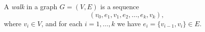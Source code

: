 \begin{dfn}
A \emph{walk} in a graph $G = (V, E)$ is a sequence
\[
(v_0, e_1, v_1, e_2, \ldots, e_k, v_k),
\]
where $v_i \in V$, and for each $i = 1, \ldots, k$ we have $e_i = \{v_{i-1}, v_i\} \in E$.
\end{dfn}